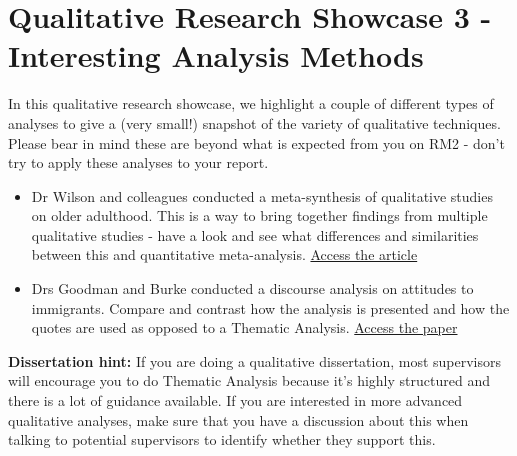 \documentclass[
  english,
  letterpaper,
  DIV=11,
  numbers=noendperiod]{scrreprt}
\providecommand{\tightlist}{%
  \setlength{\itemsep}{0pt}\setlength{\parskip}{0pt}}
\begin{document}
\section{Qualitative Research Showcase 3 - Interesting Analysis
Methods}\label{qualitative-research-showcase-3---interesting-analysis-methods}

In this qualitative research showcase, we highlight a couple of
different types of analyses to give a (very small!) snapshot of the
variety of qualitative techniques. Please bear in mind these are beyond
what is expected from you on RM2 - don't try to apply these analyses to
your report.

\begin{itemize}
\tightlist
\item
  Dr Wilson and colleagues conducted a meta-synthesis of qualitative
  studies on older adulthood. This is a way to bring together findings
  from multiple qualitative studies - have a look and see what
  differences and similarities between this and quantitative
  meta-analysis.
  \href{https://www.cambridge.org/core/journals/ageing-and-society/article/abs/developing-a-model-of-resilience-in-older-adulthood-a-qualitative-metasynthesis/AE8457482A9371FF74F391E97E43800F}{Access
  the article}
\item
  Drs Goodman and Burke conducted a discourse analysis on attitudes to
  immigrants. Compare and contrast how the analysis is presented and how
  the quotes are used as opposed to a Thematic Analysis.
  \href{https://journals.sagepub.com/doi/abs/10.1177/0957926509360743}{Access
  the paper}
\end{itemize}

\textbf{Dissertation hint:} If you are doing a qualitative dissertation,
most supervisors will encourage you to do Thematic Analysis because it's
highly structured and there is a lot of guidance available. If you are
interested in more advanced qualitative analyses, make sure that you
have a discussion about this when talking to potential supervisors to
identify whether they support this.
\end{document}
